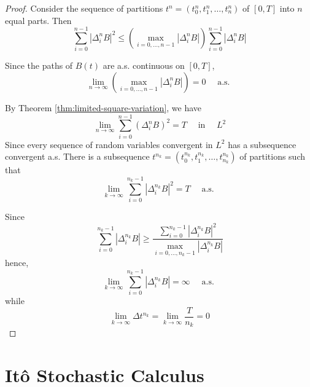 \begin{proof}
    Consider the sequence of partitions $t^{n}=\left(t_{0}^{n},t_{1}^{n},\ldots,t_{n}^{n}\right)$ of $[0,T]$ into $n$ equal parts. Then
    \begin{equation*}
        \sum_{i=0}^{n-1}\left|\Delta_{i}^{n}B\right|^{2}\leq\left(\max_{i=0,\ldots,n-1}\left|\Delta_{i}^{n}B\right|\right)\sum_{i=0}^{n-1}\left|\Delta_{i}^{n}B\right|
    \end{equation*}

    Since the paths of $B(t)$ are a.s. continuous on $[0,T]$,
    \begin{equation*}
        \lim_{n\rightarrow\infty}\left(\max_{i=0,\ldots,n-1}\left|\Delta_{i}^{n}B\right|\right)=0\quad\text{ a.s. }
    \end{equation*}

    By Theorem \ref{thm:limited-square-variation}, we have
    \begin{equation*}
        \lim_{n\rightarrow\infty}\sum_{i=0}^{n-1}\left(\Delta_{i}^{n}B\right)^{2}=T\quad\text { in }\quad L^{2}
    \end{equation*}
    Since every sequence of random variables convergent in $L^{2}$ has a subsequence convergent a.s. There is a subsequence $t^{n_{k}}=\left(t_{0}^{n_{k}},t_{1}^{n_{k}},\ldots,t_{n_{k}}^{n_{k}}\right)$ of partitions such that
    \begin{equation*}
        \lim_{k\rightarrow\infty}\sum_{i=0}^{n_{k}-1}\left|\Delta_{i}^{n_{k}}B\right|^{2}=T\quad\text{ a.s. }
    \end{equation*}

    Since
    \begin{equation*}
        \sum_{i=0}^{n_{k}-1}\left|\Delta_{i}^{n_{k}}B\right|\geq\frac{\sum_{i=0}^{n_{k}-1}\left|\Delta_{i}^{n_{k}}B\right|^{2}}{\max_{i=0,\ldots,n_{k}-1}\left|\Delta_{i}^{n_{k}}B\right|}
    \end{equation*}
    hence,
    \begin{equation*}
        \lim_{k\rightarrow\infty}\sum_{i=0}^{n_{k}-1}\left|\Delta_{i}^{n_{k}}B\right|=\infty\quad\text{ a.s. }
    \end{equation*}
    while
    $$
        \lim _{k \rightarrow \infty} \Delta t^{n_{k}}=\lim _{k \rightarrow \infty} \frac{T}{n_{k}}=0
    $$
\end{proof}

\section{It\^o Stochastic Calculus}

